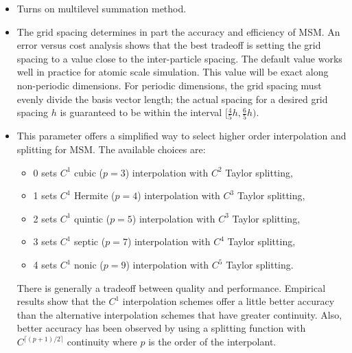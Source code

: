 \begin{itemize}

\item
{}
{Turns on multilevel summation method.}

\item
{}
{The grid spacing determines in part the accuracy and efficiency of MSM. 
An error versus cost analysis shows that the best tradeoff is setting 
the grid spacing to a value close to the inter-particle spacing. 
The default value works well in practice for atomic scale simulation.
This value will be exact along non-periodic dimensions. 
For periodic dimensions, the grid spacing must evenly divide the 
basis vector length; the actual spacing for a desired grid spacing $h$ 
is guaranteed to be within the interval
$\bigl[ \frac{4}{5} h, \frac{6}{5} h \bigr)$.}

\item
{}
{This parameter offers a simplified way to select higher order
interpolation and splitting for MSM.  The available choices are: 
\begin{itemize}
\item 0 sets $C^1$ cubic ($p=3$) interpolation with $C^2$ Taylor splitting,
\item 1 sets $C^1$ Hermite ($p=4$) interpolation with $C^3$ Taylor splitting,
\item 2 sets $C^1$ quintic ($p=5$) interpolation with $C^3$ Taylor splitting,
\item 3 sets $C^1$ septic ($p=7$) interpolation with $C^4$ Taylor splitting,
\item 4 sets $C^1$ nonic ($p=9$) interpolation with $C^5$ Taylor splitting.
\end{itemize}
There is generally a tradeoff between quality and performance. 
Empirical results show that the $C^1$ interpolation schemes offer a little
better accuracy than the alternative
interpolation schemes that have greater continuity. 
Also, better accuracy has been observed by using 
a splitting function with $C^{\lceil (p+1) / 2 \rceil}$ continuity 
where $p$ is the order of the interpolant. 
}


\end{itemize}
